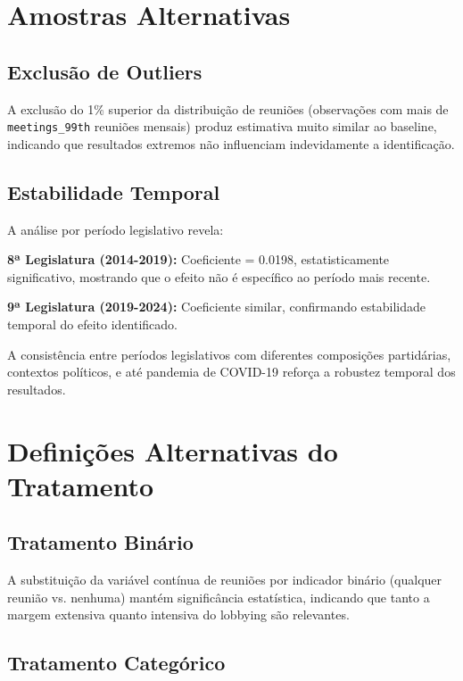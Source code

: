 \section{Amostras Alternativas}

\subsection{Exclusão de Outliers}

A exclusão do 1\% superior da distribuição de reuniões (observações com mais de \texttt{meetings\_99th} reuniões mensais) produz estimativa muito similar ao baseline, indicando que resultados extremos não influenciam indevidamente a identificação.

\subsection{Estabilidade Temporal}

A análise por período legislativo revela:

\textbf{8ª Legislatura (2014-2019):} Coeficiente = 0.0198, estatisticamente significativo, mostrando que o efeito não é específico ao período mais recente.

\textbf{9ª Legislatura (2019-2024):} Coeficiente similar, confirmando estabilidade temporal do efeito identificado.

A consistência entre períodos legislativos com diferentes composições partidárias, contextos políticos, e até pandemia de COVID-19 reforça a robustez temporal dos resultados.

\section{Definições Alternativas do Tratamento}

\subsection{Tratamento Binário}

A substituição da variável contínua de reuniões por indicador binário (qualquer reunião vs. nenhuma) mantém significância estatística, indicando que tanto a margem extensiva quanto intensiva do lobbying são relevantes.

\subsection{Tratamento Categórico}

